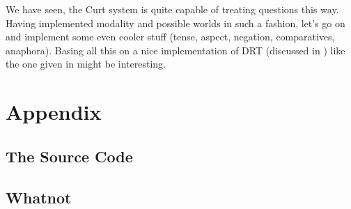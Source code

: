 \documentclass[a4paper]{article}
\begin{document}
We have seen, the Curt system is quite capable of treating questions this way.
Having implemented modality and possible worlds in such a fashion, let's go on
and implement some even cooler stuff (tense, aspect, negation, comparatives,
anaphora). Basing all this on a nice implementation of DRT (discussed in
\cite{kampreyle:drt}) like the one given in \cite{blackburnbos:cl2} might be
interesting.

\section{Appendix}

\subsection{The Source Code}

\subsection{Whatnot}


\end{document}
